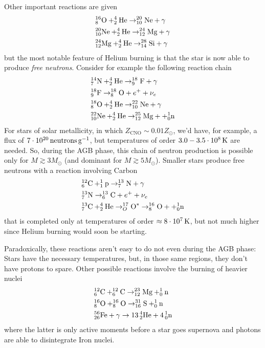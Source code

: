 \par Other important reactions are given
\begin{align*}
    &\element{O}{16}{8}+\element{He}{4}{2}\to \element{Ne}{20}{10}+\gamma\\
    &\element{Ne}{20}{10}+\element{He}{4}{2}\to \element{Mg}{24}{12}+\gamma\\
    &\element{Mg}{24}{12}+\element{He}{4}{2}\to \element{Si}{28}{14}+\gamma\\
\end{align*}
but the most notable feature of Helium burning is that the star is now able to produce \emph{free neutrons}. Consider for example the following reaction chain
\begin{align*}
    &\element{N}{14}{7}+\element{He}{4}{2}\to\element{F}{18}{9}+\gamma\\
    &\element{F}{18}{9}\to\element{O}{18}{8}+e^{+}+\nu_{e}\\
    &\element{O}{18}{8}+\element{He}{4}{2}\to\element{Ne}{22}{10}+\gamma\\
    &\element{Ne}{22}{10}+\element{He}{4}{2}\to\element{Mg}{25}{12}++\element{n}{1}{0}
\end{align*}
For stars of solar metallicity, in which $Z_{\text{CNO}}\sim 0.01Z_{\odot}$, we'd have, for example, a flux of $7\power{10}{20}\,\text{neutrons}\unit{g}^{-1}$, but temperatures of order $3.0-3.5\power{10}{8}\unit{K}$ are needed. So, during the AGB phase, this chain of neutron production is possible only for $M\gtrsim 3M_{\odot}$ (and dominant for $M\gtrsim5M_{\odot}$). Smaller stars produce free neutrons with a reaction involving Carbon 
\begin{align*}
    & \element{C}{12}{6}+\element{p}{1}{1}\to\element{N}{13}{7}+\gamma\\
    & \element{N}{13}{7}\to \element{C}{13}{6}+e^{+}+\nu_{e}\\
    & \element{C}{13}{7}+\element{He}{4}{2}\to\element{O}{17}{O}^{*}\to\element{O}{16}{8}++\element{n}{1}{0}
\end{align*}
that is completed only at temperatures of order $\approx 8\power{10}{7}\unit{K}$, but not much higher since Helium burning would soon be starting.
\par Paradoxically, these reactions aren't easy to do not even during the AGB phase: Stars have the necessary temperatures, but, in those same regions, they don't have protons to spare. Other possible reactions involve the burning of heavier nuclei
\begin{align*}
    & \element{C}{12}{6}+\element{C}{12}{6}\to\element{Mg}{23}{12}+\element{n}{1}{0}\\
    & \element{O}{16}{8}+\element{O}{16}{8}\to\element{S}{31}{16}+\element{n}{1}{0}\\
    & \element{Fe}{56}{26}+\gamma\to 13\,\element{He}{4}{2}+4\,\element{n}{1}{0}
\end{align*}
where the latter is only active moments before a star goes supernova and photons are able to disintegrate Iron nuclei.

